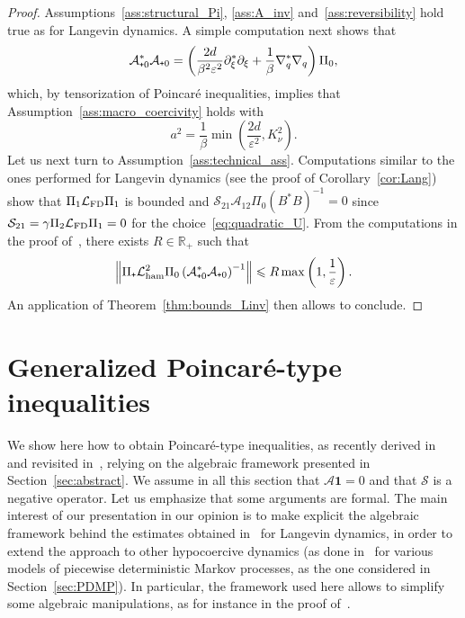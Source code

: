 \documentclass{article}
\newcommand{\cLs}{\mathcal{S}}
\newcommand{\cLa}{\mathcal{A}}
\newcommand{\cLham}{\mathcal{L}_{\rm ham}}
\newcommand{\cLFD}{\mathcal{L}_{\rm FD}}
\newcommand{\R}{\mathbb{R}}
\newcommand{\subplus}{\textnormal{\texttt{+}}}
\renewcommand{\leq}{\leqslant}
\begin{document}
\begin{proof}
Assumptions~\ref{ass:structural_Pi}, \ref{ass:A_inv} and~\ref{ass:reversibility} hold true as for Langevin dynamics. A simple computation next shows that
\[
\cLa_{\subplus 0}^*\cLa_{\subplus 0} = \left (\frac{2d}{\beta^2 \varepsilon^2} \partial_{\xi}^{*}\partial_{\xi} + \frac1\beta \nabla_{q}^{*}\nabla_{q} \right ) \Pi_0,
\]
which, by tensorization of Poincar\'e inequalities, implies that Assumption~\ref{ass:macro_coercivity} holds with
\[
  a^2 = \frac1\beta \min\left(\frac{2d}{\varepsilon^2},K_\nu^2\right).
\]
Let us next turn to Assumption~\ref{ass:technical_ass}. Computations similar to the ones performed for Langevin dynamics (see the proof of Corollary~\ref{cor:Lang}) show that $\Pi_1 \cLFD \Pi_1$ is bounded and $\cLs_{21} \cLa_{12} \Pi_0  \left(B^* B\right)^{-1} = 0$ since $\cLs_{21} = \gamma \Pi_2 \cLFD \Pi_1 = 0$ for the choice~\eqref{eq:quadratic_U}. From the computations in the proof of~\cite[Lemma~2.7]{LSS19}, there exists $R \in \R_+$ such that 
\[
\left\| \Pi_\subplus\cLham^2 \Pi_0  \left(\cLa_{\subplus 0}^*\cLa_{\subplus 0}\right)^{-1} \right\| \leq R \max\left(1,\frac1\varepsilon\right).
\]
An application of Theorem~\ref{thm:bounds_Linv} then allows to conclude.
\end{proof}
  
\appendix
\section{Generalized Poincar\'e-type inequalities}
\label{sec:gen_Poincare}

We show here how to obtain Poincar\'e-type inequalities, as recently derived in~\cite{AM19} and revisited in~\cite{CLW19}, relying on the algebraic framework presented in Section~\ref{sec:abstract}. We assume in all this section that $\cLa \mathbf{1} = 0$ and that $\cLs$ is a negative operator. Let us emphasize that some arguments are formal. The main interest of our presentation in our opinion is to make explicit the algebraic framework behind the estimates obtained in~\cite{AM19,CLW19} for Langevin dynamics, in order to extend the approach to other hypocoercive dynamics (as done in~\cite{LW20} for various models of piecewise deterministic Markov processes, as the one considered in Section~\ref{sec:PDMP}). In particular, the framework used here allows to simplify some algebraic manipulations, as for instance in the proof of~\cite[Theorem~2]{CLW19}.
\end{document}
